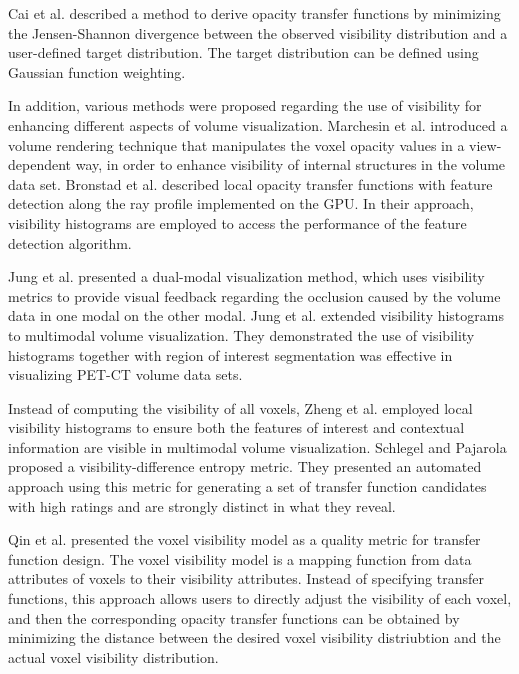 \documentclass{egpubl}
\begin{document}
Cai et al. \cite{cai_automatic_2013} described a method to derive opacity transfer functions by minimizing the Jensen-Shannon divergence between the observed visibility distribution and a user-defined target distribution. The target distribution can be defined using Gaussian function weighting.



In addition, various methods were proposed regarding the use of visibility for enhancing different aspects of volume visualization.
Marchesin et al. \cite{marchesin_per-pixel_2010} introduced a volume rendering technique that manipulates the voxel opacity values in a view-dependent way, in order to enhance visibility of internal structures in the volume data set.
Bronstad et al. \cite{bronstad_visibility_2012} described local opacity transfer functions with feature detection along the ray profile implemented on the GPU. In their approach, visibility histograms are employed to access the performance of the feature detection algorithm.

Jung et al. \cite{jung_dual-modal_2012} presented a dual-modal visualization method, which uses visibility metrics to provide visual feedback regarding the occlusion caused by the volume data in one modal on the other modal.
Jung et al. \cite{jung_visibility-driven_2013} extended visibility histograms to multimodal volume visualization.
They demonstrated the use of visibility histograms together with region of interest segmentation was effective in visualizing PET-CT volume data sets.

Instead of computing the visibility of all voxels, Zheng et al. \cite{zheng_visibility_2013} employed local visibility histograms to ensure both the features of interest and contextual information are visible in multimodal volume visualization.
Schlegel and Pajarola \cite{schlegel_visibility-difference_2013} proposed a visibility-difference entropy metric. They presented an automated approach using this metric for generating a set of transfer function candidates with high ratings and are strongly distinct in what they reveal.

Qin et al. \cite{qin_voxel_2015} presented the voxel visibility model as a quality metric for transfer function design.
The voxel visibility model is a mapping function from data attributes of voxels to their visibility attributes. Instead of specifying transfer functions, this approach allows users to directly adjust the visibility of each voxel, and then the corresponding opacity transfer functions can be obtained by minimizing the distance between the desired voxel visibility distriubtion and the actual voxel visibility distribution.
\end{document}
